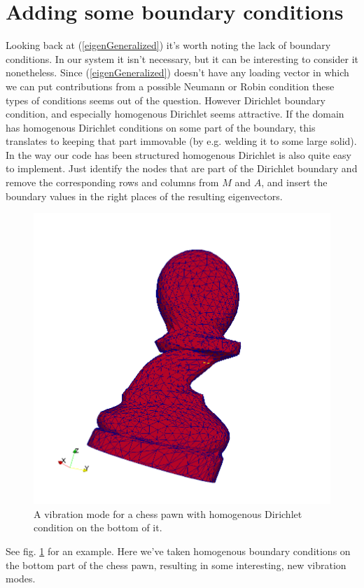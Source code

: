 \documentclass[paper=a4, fontsize=11pt]{scrartcl} %
\begin{document}
\section*{Adding some boundary conditions}
Looking back at (\ref{eigenGeneralized}) it's worth noting the lack of boundary conditions. In our system it isn't necessary, but it can be interesting to consider it nonetheless. Since (\ref{eigenGeneralized}) doesn't have any loading vector in which we can put contributions from a possible Neumann or Robin condition these types of conditions seems out of the question. However Dirichlet boundary condition, and especially homogenous Dirichlet seems attractive. If the domain has homogenous Dirichlet conditions on some part of the boundary, this translates to keeping that part immovable (by e.g. welding it to some large solid). In the way our code has been structured homogenous Dirichlet is also quite easy to implement. Just identify the nodes that are part of the Dirichlet boundary and remove the corresponding rows and columns from $M$ and $A$, and insert the boundary values in the right places of the resulting eigenvectors.
\begin{figure}
\centering
\includegraphics[scale=0.3]{HmgPawn.png}
\caption{A vibration mode for a chess pawn with homogenous Dirichlet condition on the bottom of it.}
\label{fig:HmgPawn}
\end{figure}
See fig. \ref{fig:HmgPawn} for an example. Here we've taken homogenous boundary conditions on the bottom part of the chess pawn, resulting in some interesting, new vibration modes.
\end{document}
